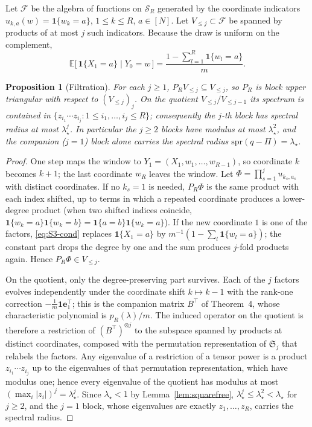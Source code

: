 \documentclass[twoside,11pt]{article}
\newtheorem{sprop}[slemma]{Proposition}
\begin{document}
Let $\mathcal{F}$ be the algebra of functions on $\mathcal S_R$ generated by
the coordinate indicators $u_{k,a}(w)=\mathbf{1}\{w_k=a\}$, $1\le k\le R$,
$a\in[N]$. Let $V_{\le j}\subset\mathcal{F}$ be spanned by products of at
most $j$ such indicators. Because the draw is uniform on the complement,
\begin{equation}\label{eq:S3-cond}
\mathbb E\big[\,\mathbf{1}\{X_1=a\}\mid Y_0=w\,\big]
=\frac{1-\sum_{l=1}^{R}\mathbf{1}\{w_l=a\}}{m}.
\end{equation}
\begin{sprop}[Filtration]\label{prop:filtration}
For each $j\ge1$, $P_RV_{\le j}\subseteq V_{\le j}$, so $P_R$ is block upper
triangular with respect to $(V_{\le j})_j$. On the quotient
$V_{\le j}/V_{\le j-1}$ its spectrum is contained in
$\{z_{i_1}\cdots z_{i_j}:1\le i_1,\dots,i_j\le R\}$; consequently the
$j$-th block has spectral radius at most $\lambda_\star^{j}$. In particular the
$j\ge2$ blocks have modulus at most $\lambda_\star^{2}$, and the companion
($j=1$) block alone carries the spectral radius $\mathrm{spr}(q-\Pi)=\lambda_\star$.
\end{sprop}

\begin{proof}
One step maps the window to $Y_1=(X_1,w_1,\dots,w_{R-1})$, so coordinate
$k$ becomes $k+1$; the last coordinate $w_R$ leaves the window. Let
$\Phi=\prod_{s=1}^{j}u_{k_s,a_s}$ with distinct coordinates. If no
$k_s=1$ is needed, $P_R\Phi$ is the same product with each index shifted,
up to terms in which a repeated coordinate produces a lower-degree product
(when two shifted indices coincide, $\mathbf{1}\{w_k=a\}\mathbf{1}\{w_k=b\}=\mathbf{1}\{a=b\}\mathbf{1}\{w_k=a\}$).
If the new coordinate $1$ is one of the factors, \eqref{eq:S3-cond}
replaces $\mathbf{1}\{X_1=a\}$ by $m^{-1}(1-\sum_l\mathbf{1}\{w_l=a\})$; the constant part
drops the degree by one and the sum produces $j$-fold products again. Hence
$P_R\Phi\in V_{\le j}$.

On the quotient, only the degree-preserving part survives. Each of the $j$
factors evolves independently under the coordinate shift $k\mapsto k-1$
with the rank-one correction $-\frac1m\mathbf 1 \mathbf{e}_1^{\top}$; this is the
companion matrix $B^{\top}$ of Theorem~4, whose characteristic
polynomial is $p_R(\lambda)/m$. The induced operator on the quotient is
therefore a restriction of $(B^{\top})^{\otimes j}$ to the subspace spanned
by products at distinct coordinates, composed with the permutation
representation of $\mathfrak{S}_j$ that relabels the factors. Any eigenvalue of a
restriction of a tensor power is a product $z_{i_1}\cdots z_{i_j}$ up to the
eigenvalues of that permutation representation, which have modulus one;
hence every eigenvalue of the quotient has modulus at most
$(\max_i|z_i|)^{j}=\lambda_\star^{j}$. Since $\lambda_\star<1$ by Lemma~\ref{lem:squarefree},
$\lambda_\star^{j}\le\lambda_\star^{2}<\lambda_\star$ for $j\ge2$, and the $j=1$ block, whose eigenvalues
are exactly $z_1,\dots,z_R$, carries the spectral radius.
\end{proof}
\end{document}
